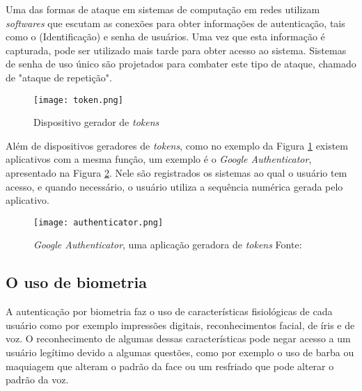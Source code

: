 \begin{citacao}
Uma das formas de ataque em sistemas de computação em redes utilizam \textit{softwares} que escutam as conexões para obter informações de autenticação, tais como o  (Identificação) e senha de usuários. Uma vez que esta informação é capturada, pode ser utilizado mais tarde para obter acesso ao sistema. Sistemas de senha de uso único são projetados para combater este tipo de ataque, chamado de "ataque de repetição".\cite{rfc2289}
\end{citacao}

\vspace{-3mm}
\begin{figure}[!htb]
	\centering
	\texttt{[image: token.png]}
	\vspace{-3mm}
	\footnotesize
	\caption[Dispositivo gerador de \textit{tokens}]{Dispositivo gerador de \textit{tokens}}
	\label{fig:token}
\end{figure}

Além de dispositivos geradores de \textit{tokens}, como no exemplo da Figura \ref{fig:token} existem aplicativos com a mesma função, um exemplo é o \textit{Google Authenticator}, apresentado na Figura \ref{fig:tokenapp}. Nele são registrados os sistemas ao qual o usuário tem acesso, e quando necessário, o usuário utiliza a sequência numérica gerada pelo aplicativo.

\vspace{-3mm}
\begin{figure}[!htb]
	\centering
	\texttt{[image: authenticator.png]}
	\vspace{-2mm}
	\caption[\textit{Google Authenticator}, uma aplicação geradora de \textit{tokens}]{\textit{Google Authenticator}, uma aplicação geradora de \textit{tokens} Fonte: \cite{authenticator}}
	\label{fig:tokenapp}
\end{figure}

\subsection{O uso de biometria}
A autenticação por biometria faz o uso de características fisiológicas de cada usuário como por exemplo impressões digitais, reconhecimentos facial, de íris e de voz.
O reconhecimento de algumas dessas características pode negar acesso a um usuário legítimo devido a algumas questões, como por exemplo o uso de barba ou maquiagem que alteram o padrão da face ou um resfriado que pode alterar o padrão da voz.

